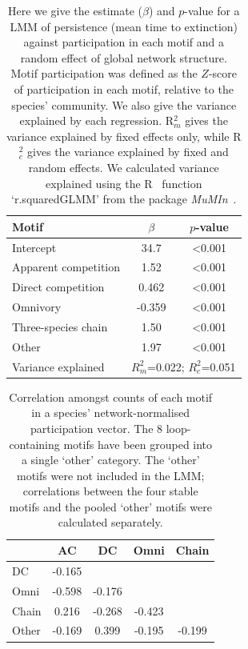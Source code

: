 \documentclass[12pt]{article}
\begin{document}
\begin{spacing}{2.0}
		\begin{table}[h!]
		\caption{Here we give the estimate ($\beta$) and $p$-value for a LMM of persistence (mean time to extinction) against participation in each motif and a random effect of global network structure.  Motif participation was defined as the $Z$-score of participation in each motif, relative to the species' community. We also give the variance explained by each regression. R$^{2}_{m}$ gives the variance explained by fixed effects only, while R$^{2}_{c}$ gives the variance explained by fixed and random effects. We calculated variance explained using the R~\citep{R} function `r.squaredGLMM' from the package \emph{MuMIn}~\citep{MuMIn}.}
		\label{tab:persistence_Z}
		\begin{tabular}{l | c c}
		 Motif & $\beta$ & $p$-value \\  
		 \hline
		 Intercept & 34.7 & \textless0.001 \\
		 \hline
		 Apparent competition & 1.52 & \textless0.001 \\
		 Direct competition &  0.462  & \textless0.001 \\
		 Omnivory & -0.359  & \textless0.001 \\
		 Three-species chain & 1.50 & \textless0.001 \\
		 Other &  1.97  & \textless0.001 \\
		 \hline
		 Variance explained & \multicolumn{2}{c}{$R^{2}_m$=0.022; $R^{2}_c$=0.051} \\
		 \hline
		 \end{tabular}
		 \end{table}


		\begin{table}[h!]
		\caption{Correlation amongst counts of each motif in a species' network-normalised participation vector. The 8 loop-containing motifs have been grouped into a single `other' category. The `other' motifs were not included in the LMM; correlations between the four stable motifs and the pooled `other' motifs were calculated separately.}
		\label{tab:Z_correlations}
		\begin{tabular}{l | c c c c}
			& AC & DC & Omni & Chain \\
		\hline
		DC     & -0.165 &        &        &    \\
		Omni   & -0.598 & -0.176 &        &     \\
		Chain  &  0.216 & -0.268 & -0.423 &      \\
		Other  & -0.169 &  0.399 & -0.195 & -0.199 \\
		\hline
		\end{tabular}
		\end{table}


\end{spacing}
\end{document}
